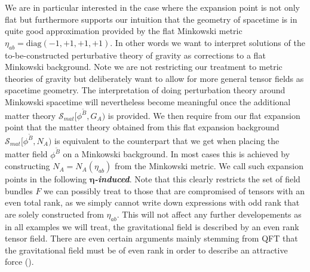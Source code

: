 \documentclass[a4paper,12pt, DIV=14, BCOR=5mm, twoside, headsepline]{scrbook}
\begin{document}
We are in particular interested in the case where the expansion point is not only flat but furthermore supports our intuition that the geometry of spacetime is in quite good approximation provided by the flat Minkowski metric $\eta_{ab} = \mathrm{diag}(-1,+1,+1,+1)$. 
%
%
In other words we want to interpret solutions of the to-be-constructed perturbative theory of gravity as corrections to a flat Minkowski background. Note we are not restricting our treatment to metric theories of gravity but deliberately want to allow for more general tensor fields as spacetime geometry.
The interpretation of doing perturbation theory around Minkowski spacetime will nevertheless become meaningful once the additional matter theory $\mathcal{S}_{mat}[\phi^{\tilde{B}},G_A)$ is provided. We then require from our flat expansion point that the matter theory obtained from this flat expansion background $\mathcal{S}_{mat}[\phi^{\tilde{B}},N_A)$ is equivalent to the counterpart that we get when placing the matter field $\phi^{\tilde{B}}$ on a Minkowski background. 
In most cases this is achieved by constructing $N_A = N_A(\eta_{ab})$ from the Minkowski metric. We call such expansion points in the following \textit{\textbf{$\boldsymbol{\eta}$-induced}}. Note that this clearly restricts the set of field bundles $F$ we can possibly treat to those that are compromised of tensors with an even total rank, as we simply cannot write down expressions with odd rank that are solely constructed from $\eta_{ab}$. This will not affect any further developements as in all examples we will treat, the gravitational field is described by an even rank tensor field. There are even certain arguments mainly stemming from QFT that the gravitational field must be of even rank in order to describe an attractive force (\cite{vecchiato2017variational}). \\
\end{document}
